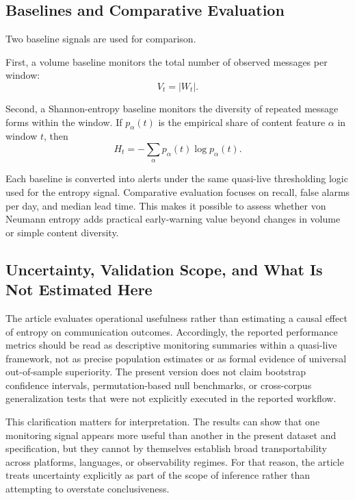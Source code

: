 \documentclass[sigconf]{acmart}
\begin{document}
\subsection{Baselines and Comparative Evaluation}

Two baseline signals are used for comparison.

First, a volume baseline monitors the total number of observed messages per window:
\begin{equation}
V_t = |W_t|.
\end{equation}

Second, a Shannon-entropy baseline monitors the diversity of repeated message forms within the window. If $p_{\alpha}(t)$ is the empirical share of content feature $\alpha$ in window $t$, then
\begin{equation}
H_t = - \sum_{\alpha} p_{\alpha}(t) \log p_{\alpha}(t).
\end{equation}

Each baseline is converted into alerts under the same quasi-live thresholding logic used for the entropy signal. Comparative evaluation focuses on recall, false alarms per day, and median lead time. This makes it possible to assess whether von Neumann entropy adds practical early-warning value beyond changes in volume or simple content diversity.

\subsection{Uncertainty, Validation Scope, and What Is Not Estimated Here}

The article evaluates operational usefulness rather than estimating a causal effect of entropy on communication outcomes. Accordingly, the reported performance metrics should be read as descriptive monitoring summaries within a quasi-live framework, not as precise population estimates or as formal evidence of universal out-of-sample superiority. The present version does not claim bootstrap confidence intervals, permutation-based null benchmarks, or cross-corpus generalization tests that were not explicitly executed in the reported workflow.

This clarification matters for interpretation. The results can show that one monitoring signal appears more useful than another in the present dataset and specification, but they cannot by themselves establish broad transportability across platforms, languages, or observability regimes. For that reason, the article treats uncertainty explicitly as part of the scope of inference rather than attempting to overstate conclusiveness.
\end{document}
